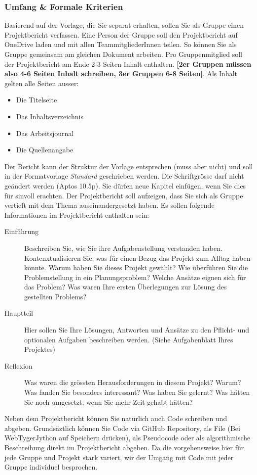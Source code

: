 \documentclass[12pt, a4]{article}
\begin{document}
\subsubsection*{Umfang \& Formale Kriterien}
Basierend auf der Vorlage, die Sie separat erhalten, sollen Sie als Gruppe einen Projektbericht verfassen.
Eine Person der Gruppe soll den Projektbericht auf OneDrive laden und mit allen TeammitgliederInnen teilen.
So können Sie als Gruppe gemeinsam am gleichen Dokument arbeiten.
Pro Gruppenmitglied soll der Projektbericht am Ende 2-3 Seiten Inhalt enthalten.
\textbf{[2er Gruppen müssen also 4-6 Seiten Inhalt schreiben, 3er Gruppen 6-8 Seiten]}.
Als Inhalt gelten alle Seiten ausser:
\begin{itemize}
    \item Die Titelseite
    \item Das Inhaltsverzeichnis
    \item Das Arbeitsjournal
    \item Die Quellenangabe
\end{itemize}
Der Bericht kann der Struktur der Vorlage entsprechen (muss aber nicht) und soll in der Formatvorlage \textit{Standard} geschrieben werden.
Die Schriftgrösse darf nicht geändert werden (Aptos 10.5p). 
Sie dürfen neue Kapitel einfügen, wenn Sie dies für sinvoll erachten.
Der Projektbericht soll aufzeigen, dass Sie sich als Gruppe vertieft mit dem Thema auseinandergesetzt haben.
Es sollen folgende Informationen im Projektbericht enthalten sein:
\begin{description}
    \item[Einführung] Beschreiben Sie, wie Sie ihre Aufgabenstellung verstanden haben. Kontenxtualisieren Sie, was für einen Bezug das Projekt zum Alltag haben könnte. Warum haben Sie dieses Projekt gewählt? Wie überführen Sie die Problemstellung in ein Planungsproblem? Welche Ansätze eignen sich für das Problem? Was waren Ihre ersten Überlegungen zur Lösung des gestellten Problems?
    \item[Hauptteil] Hier sollen Sie Ihre Lösungen, Antworten und Ansätze zu den Pflicht- und optionalen Aufgaben beschreiben werden. (Siehe Aufgabenblatt Ihres Projektes)
    \item[Reflexion] Was waren die grössten Herausforderungen in diesem Projekt? Warum? Was fanden Sie besonders interessant? Was haben Sie gelernt? Was hätten Sie noch umgesetzt, wenn Sie mehr Zeit gehabt hätten?
\end{description}
Neben dem Projektbericht können Sie natürlich auch Code schreiben und abgeben.
Grundsäztlich können Sie Code via GitHub Repository, als File (Bei WebTygerJython auf Speichern drücken), als Pseudocode oder als algorithmische Beschreibung direkt im Projektbericht abgeben.
Da die vorgehensweise hier für jede Gruppe und Projekt stark variert, wir der Umgang mit Code mit jeder Gruppe individuel besprochen.
\end{document}
